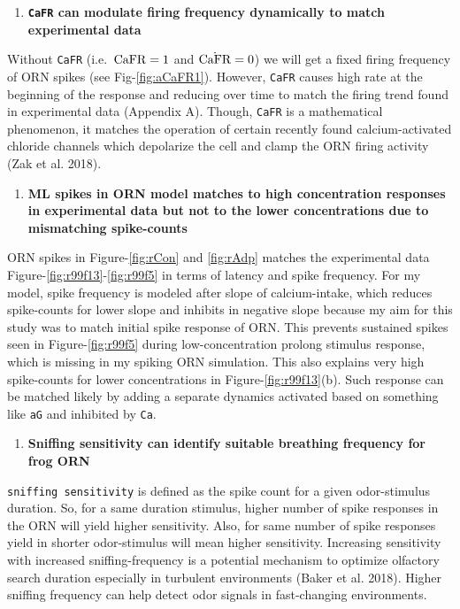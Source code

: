 \documentclass[
]{article}
\providecommand{\tightlist}{%
  \setlength{\itemsep}{0pt}\setlength{\parskip}{0pt}}
\begin{document}
\begin{enumerate}
\def\labelenumi{\Alph{enumi}.}
\setcounter{enumi}{3}
\tightlist
\item
  \textbf{\texttt{CaFR} can modulate firing frequency dynamically to match experimental data}
\end{enumerate}

Without \texttt{CaFR} (i.e.~\({\rm CaFR}=1\) and \(\dot{\rm CaFR}=0\)) we will get a fixed firing frequency of ORN spikes (see Fig-\ref{fig:aCaFR1}). However, \texttt{CaFR} causes high rate at the beginning of the response and reducing over time to match the firing trend found in experimental data (Appendix A). Though, \texttt{CaFR} is a mathematical phenomenon, it matches the operation of certain recently found calcium-activated chloride channels which depolarize the cell and clamp the ORN firing activity (Zak et al. 2018).

\begin{enumerate}
\def\labelenumi{\Alph{enumi}.}
\setcounter{enumi}{4}
\tightlist
\item
  \textbf{ML spikes in ORN model matches to high concentration responses in experimental data but not to the lower concentrations due to mismatching spike-counts}
\end{enumerate}

ORN spikes in Figure-\ref{fig:rCon} and \ref{fig:rAdp} matches the experimental data Figure-\ref{fig:r99f13}-\ref{fig:r99f5} in terms of latency and spike frequency. For my model, spike frequency is modeled after slope of calcium-intake, which reduces spike-counts for lower slope and inhibits in negative slope because my aim for this study was to match initial spike response of ORN. This prevents sustained spikes seen in Figure-\ref{fig:r99f5} during low-concentration prolong stimulus response, which is missing in my spiking ORN simulation. This also explains very high spike-counts for lower concentrations in Figure-\ref{fig:r99f13}(b). Such response can be matched likely by adding a separate dynamics activated based on something like \texttt{aG} and inhibited by \texttt{Ca}.

\begin{enumerate}
\def\labelenumi{\Alph{enumi}.}
\setcounter{enumi}{5}
\tightlist
\item
  \textbf{Sniffing sensitivity can identify suitable breathing frequency for frog ORN}
\end{enumerate}

\texttt{sniffing\ sensitivity} is defined as the spike count for a given odor-stimulus duration. So, for a same duration stimulus, higher number of spike responses in the ORN will yield higher sensitivity. Also, for same number of spike responses yield in shorter odor-stimulus will mean higher sensitivity. Increasing sensitivity with increased sniffing-frequency is a potential mechanism to optimize olfactory search duration especially in turbulent environments (Baker et al. 2018). Higher sniffing frequency can help detect odor signals in fast-changing environments.
\end{document}
